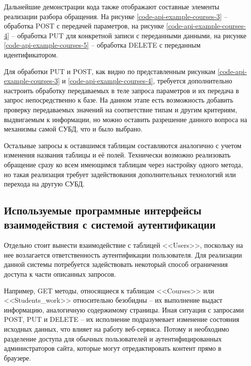Дальнейшие демонстрации кода также отображают составные элементы реализации разбора обращения.
На рисунке \ref{code-api-example-courses-3} -- обработка POST с передачей параметров, на рисунке \ref{code-api-example-courses-4} -- обработка PUT для конкретной записи с переданными данными,
на рисунке \ref{code-api-example-courses-5} -- обработка DELETE с переданным идентификатором.



Для обработки PUT и POST, как видно по представленным рисункам \ref{code-api-example-courses-3} и \ref{code-api-example-courses-4}, требуется дополнительно настроить обработку передаваемых в теле запроса параметров и их передача в запрос непосредственно к базе.
На данном этапе есть возможность добавить проверку передаваемых значений на соответствие типам и другим критериям, выдвигаемым к информации, но можно оставить разрешение данного вопроса на механизмы самой СУБД, что и было выбрано.


Остальные запросы к оставшимся таблицам составляются аналогично с учетом изменения названия таблицы и её полей.
Технически возможно реализовать обращение сразу ко всем имеющимся таблицам через настройку одного метода, но такая реализация требует задействования дополнительных технологий или перехода на другую СУБД.


\subsection{Используемые программные интерфейсы взаимодействия с системой аутентификации}

Отдельно стоит вынести взаимодействие с таблицей <<Users>>, поскольку на нее возлагается ответственность аутентификации пользователя.
Для реализации данной системы потребуется задействовать некоторый способ ограничения доступа к части описанных запросов.

Например, GET методы, относящиеся к таблицам <<Courses>> или <<Students\_work>> относительно безобидны -- их выполнение выдаст информацию, аналогичную содержимому страницы.
Иная ситуация с запросами POST, PUT и DELETE -- их исполнение подразумевает изменение состояния исходных данных, что влияет на работу веб-сервиса.
Потому и необходимо разделение доступа для обычных пользователей и аутентифицированных администраторов сайта, которые могут отредактировать контент прямо в браузере.

